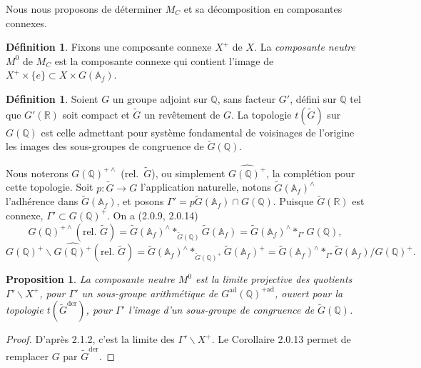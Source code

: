\documentclass[12pt,a4paper]{article}
\theoremstyle{plain}
\newtheorem{proposition}[theorem]{Proposition}
\theoremstyle{definition}
\newtheorem{definition}[theorem]{D\'efinition}
\theoremstyle{remark}
\newcommand{\QQ}{\mathbb{Q}}
\newcommand{\RR}{\mathbb{R}}
\newcommand{\Af}{\mathbb{A}_f}
\begin{document}
Nous nous proposons de d\'eterminer $M_C$ et sa d\'ecomposition en composantes connexes.

\begin{definition}
Fixons une composante connexe $X^+$ de $X$. La \textit{composante neutre} $M^0$ de $M_C$ est la composante connexe qui contient l'image de $X^+ \times \{e\} \subset X \times G(\Af)$.
\end{definition}

\begin{definition}
Soient $G$ un groupe adjoint sur $\QQ$, sans facteur $G'$, d\'efini sur $\QQ$ tel que $G'(\RR)$ soit compact et $\tilde{G}$ un rev\^etement de $G$. La topologie $t(\tilde{G})$ sur $G(\QQ)$ est celle admettant pour syst\`eme fondamental de voisinages de l'origine les images des sous-groupes de congruence de $\tilde{G}(\QQ)$.

Nous noterons $G(\QQ)^{+\wedge}$ (rel.~$\tilde{G}$), ou simplement $\widehat{G(\QQ)^+}$, la compl\'etion pour cette topologie. Soit $p:\tilde{G} \to G$ l'application naturelle, notons $\tilde{G}(\Af)^{\wedge}$ l'adh\'erence dans $\tilde{G}(\Af)$, et posons $\Gamma' = p\tilde{G}(\Af) \cap G(\QQ)$. Puisque $\tilde{G}(\RR)$ est connexe, $\Gamma' \subset G(\QQ)^+$. On a (2.0.9, 2.0.14)
\begin{equation}\label{eq:2.1.6.1}
G(\QQ)^{+\wedge}(\text{rel.~}\tilde{G}) = \tilde{G}(\Af)^{\wedge} *_{\tilde{G}(\QQ)} \tilde{G}(\Af) = \tilde{G}(\Af)^{\wedge} *_{\Gamma'} G(\QQ),
\end{equation}
\begin{equation}\label{eq:2.1.6.2}
G(\QQ)^+\backslash\widehat{G(\QQ)^+}(\text{rel.~}\tilde{G}) = \tilde{G}(\Af)^{\wedge} *_{\tilde{G}(\QQ)^+} \tilde{G}(\Af)^+ = \tilde{G}(\Af)^{\wedge} *_{\Gamma'} \tilde{G}(\Af)/G(\QQ)^+.
\end{equation}
\end{definition}

\begin{proposition}
La composante neutre $M^0$ est la limite projective des quotients $\Gamma'\backslash X^+$, pour $\Gamma'$ un sous-groupe arithm\'etique de $G^{\text{ad}}(\QQ)^{+\text{ad}}$, ouvert pour la topologie $t(\tilde{G}^{\text{der}})$, pour $\Gamma'$ l'image d'un sous-groupe de congruence de $\tilde{G}(\QQ)$.
\end{proposition}

\begin{proof}
D'apr\`es 2.1.2, c'est la limite des $\Gamma'\backslash X^+$. Le Corollaire 2.0.13 permet de remplacer $G$ par $\tilde{G}^{\text{der}}$.
\end{proof}
\end{document}
